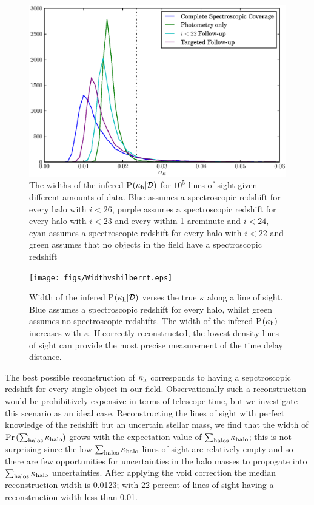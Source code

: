 \documentclass[useAMS,usenatbib]{mn2e}
\begin{document}
\begin{figure}
\includegraphics[width=\columnwidth]{figs/Width.eps}
\caption[magcut]{The widths of the infered P$(\kappa_{\rm h}|\mathcal{D})$ for $10^5$ lines of sight given different amounts of data. Blue assumes a spectroscopic redshift for every halo with $i<26$, purple assumes a spectroscopic redshift for every halo with $i<23$ and every within 1 arcminute and $i<24$, cyan assumes a spectroscopic redshift for every halo with $i<22$ and green assumes that no objects in the field have a spectroscopic redshift}
\label{fig:reconwidths}
\end{figure}

\begin{figure}
\texttt{[image: figs/Widthvshilberrt.eps]}
\caption[magcut]{Width of the infered P$(\kappa_{\rm h}|\mathcal{D})$ verses the true $\kappa$ along a line of sight. Blue assumes a spectroscopic redshift for every halo, whilst green assumes no spectroscopic redshifts. The width of the infered P$(\kappa_{\rm h})$ increases with $\kappa$. If correctly reconstructed, the lowest density lines of sight can provide the most precise measurement of the time delay distance.}
\label{fig:widthsvsH}
\end{figure}

The best possible reconstruction of $\kappa_{\rm h}$ corresponds to having a sepctroscopic redshift for every single object in our field. Observationally such a reconstruction would be prohibitively expensive in terms of telescope time, but we investigate this scenario as an ideal case. Reconstructing the lines of sight with perfect knowledge of the redshift but an uncertain stellar mass, we find that the width of $\Pr\left(\sum_{\rm halos} \kappa_{\rm halo} \right)$ grows with the expectation value of $\sum_{\rm halos} \kappa_{\rm halo}$; this is not surprising since the low $\sum_{\rm halos} \kappa_{\rm halo}$ lines of sight are relatively empty and so there are few opportunities for uncertainties in the halo masses to propogate into $\sum_{\rm halos} \kappa_{\rm halo}$ uncertainties. After applying the void correction the median reconstruction width is 0.0123; with 22 percent of lines of sight having a reconstruction width less than 0.01. 
\end{document}
